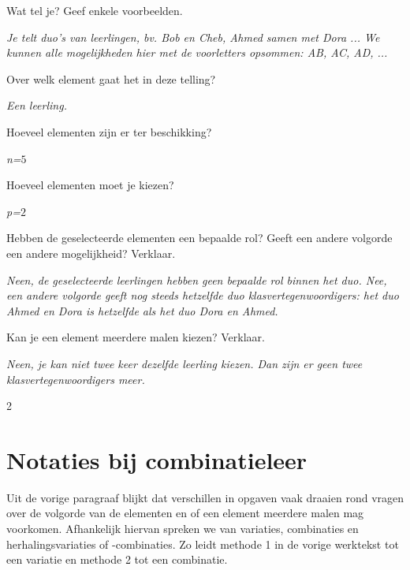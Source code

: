 \begin{werktekstoef}

\item {Wat tel je? Geef enkele voorbeelden.}

\emph{Je telt duo’s van leerlingen, bv.  Bob en Cheb, Ahmed samen met Dora ... We kunnen alle mogelijkheden hier met de voorletters opsommen: AB, AC, AD, ...}

\item{Over welk element gaat het in deze telling?}

\emph{Een leerling.}

\item{Hoeveel elementen zijn er ter beschikking?}

\emph{n=$5$}

\item{Hoeveel elementen moet je kiezen?}

\emph{p=$2$}

\item {Hebben de geselecteerde elementen een bepaalde rol? Geeft een andere volgorde een andere mogelijkheid? Verklaar.}

\emph{Neen, de geselecteerde leerlingen hebben geen bepaalde rol binnen het duo. Nee, een andere volgorde geeft nog steeds hetzelfde duo klasvertegenwoordigers: het duo Ahmed en Dora is hetzelfde als het duo Dora en Ahmed.}

\item {Kan je een element meerdere malen kiezen? Verklaar.}

\emph{Neen, je kan niet twee keer dezelfde leerling kiezen.  Dan zijn er geen twee klasvertegenwoordigers meer.}

\end{werktekstoef}

\eindewerktekst

\begin{multicols}{2} 

\section{Notaties bij combinatieleer}

Uit de vorige paragraaf blijkt dat verschillen in opgaven vaak draaien rond vragen over de volgorde van de elementen en of een element meerdere malen mag voorkomen. Afhankelijk hiervan spreken we van variaties, combinaties en herhalingsvariaties of -combinaties. Zo leidt methode 1 in de vorige werktekst tot een variatie en methode 2 tot een combinatie. 
 
\end{multicols}

